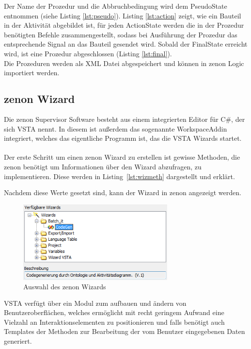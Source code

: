 Der Name der Prozedur und die Abbruchbedingung wird dem PseudoState entnommen (siehe Listing \ref{lst:pseudo}). Listing \ref{lst:action} zeigt, wie ein Bauteil in der Aktivität abgebildet ist, für jeden ActionState werden die in der Prozedur benötigten Befehle zusammengestellt, sodass bei Ausführung der Prozedur das entsprechende Signal an das Bauteil gesendet wird. Sobald der FinalState erreicht wird, ist eine Prozedur abgeschlossen (Listing \ref{lst:final}).\\

Die Prozeduren werden als \ac{XML} Datei abgespeichert und können in zenon Logic importiert werden.

\subsection{zenon Wizard}
Die zenon Supervisor Software besteht aus einem integrierten Editor für C\#, der sich \ac{VSTA} nennt. In diesem ist außerdem das sogenannte WorkspaceAddin integriert, welches das eigentliche Programm ist, das die \ac{VSTA} Wizards startet.\\\\
Der erste Schritt um einen zenon Wizard zu erstellen ist gewisse Methoden, die zenon benötigt um Informationen über den Wizard abzufragen, zu implementieren. Diese werden in Listing~\ref{lst:wizmeth} dargestellt und erklärt.


Nachdem diese Werte gesetzt sind, kann der Wizard in zenon angezeigt werden.
\begin{figure}[hbt!]
  \centering
  \includegraphics[width=0.7\textwidth]{graphics/implementation/wizards}
  \caption{Auswahl des zenon Wizards}
\end{figure}

\ac{VSTA} verfügt über ein Modul zum aufbauen und ändern von Benutzeroberflächen, welches ermöglicht mit recht geringem Aufwand eine Vielzahl an Interaktionselementen zu positionieren und falls benötigt auch Templates der Methoden zur Bearbeitung der vom Benutzer eingegebenen Daten generiert.

